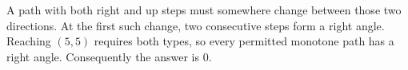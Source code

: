 A path with both right and up steps must somewhere change between those two directions. At the first such change, two consecutive steps form a right angle. Reaching $(5,5)$ requires both types, so every permitted monotone path has a right angle. Consequently the answer is $\boxed0$.
